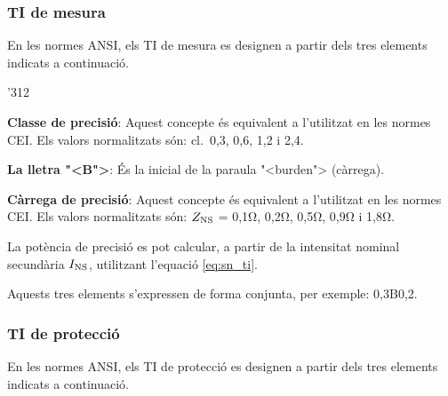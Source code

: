 \subsubsection{TI de mesura}

En les normes \textsf{ANSI}, els TI de mesura  es designen a partir
dels tres elements indicats a continuaci\'{o}.

\begin{dingautolist}{'312}
    \item \textbf{Classe de precisi\'{o}}: Aquest concepte \'{e}s equivalent
    a l'utilitzat en les normes \textsf{CEI}. Els valors
    normalitzats s\'{o}n: cl.~0,3, 0,6, 1,2 i 2,4.
    \item \textbf{La lletra {"<}B{">}}: \'{E}s la inicial de la paraula
    {"<}burden{">}  (c\`{a}rrega).
    \item \textbf{C\`{a}rrega de precisi\'{o}}: Aquest concepte \'{e}s equivalent
    a l'utilitzat en les normes \textsf{CEI}. Els valors
    normalitzats s\'{o}n: $Z_\mathrm{NS}$ = 0,1\unit{\ohm}, 0,2\unit{\ohm},
     0,5\unit{\ohm}, 0,9\unit{\ohm} i 1,8\unit{\ohm}.

    La pot\`{e}ncia de precisi\'{o} es pot calcular, a partir de la
    intensitat nominal secund\`{a}ria $I_\mathrm{NS}$, utilitzant l'equaci\'{o}
    \eqref{eq:sn_ti}.
\end{dingautolist}

Aquests tres elements s'expressen de forma conjunta, per exemple:
0,3B0,2.

\subsubsection{TI de protecci\'{o}}

En les normes \textsf{ANSI}, els TI de protecci\'{o} es designen a
partir dels tres elements indicats a continuaci\'{o}.

